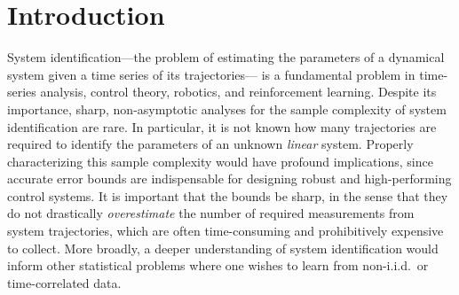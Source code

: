 \section{Introduction}


%
%

System identification---the problem of estimating the parameters of a dynamical system given a time series of its trajectories--- is a fundamental problem in time-series analysis, control theory, robotics, and reinforcement learning.
%
Despite its importance, sharp, non-asymptotic analyses for the sample complexity of system identification are rare. In particular, it is not known how many trajectories are required to identify the parameters of an unknown \emph{linear} system.
%
Properly characterizing this sample complexity would have profound implications, since accurate error bounds are indispensable for designing robust and high-performing control systems. It is important that the bounds be sharp, in the sense that they do not drastically \emph{overestimate} the number of required measurements from system trajectories, which are often time-consuming and prohibitively expensive to collect. 
More broadly, a deeper understanding of system identification would inform other statistical problems where one wishes to learn from non-i.i.d.\ or time-correlated data.


